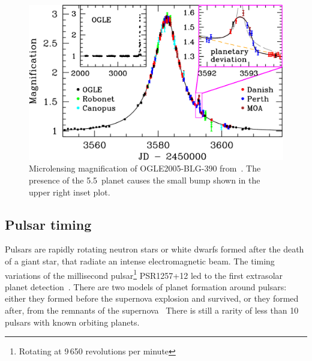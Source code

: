\begin{figure}
    \centering
    \includegraphics[width=0.5\linewidth]{./figures/introduction/Microlensing_OGLE2005-BLG-390.pdf}
    \caption{Microlensing magnification of OGLE2005-BLG-390 from~\citep{beaulieu_discovery_2006}.
    The presence of the 5.5\,\Mjup{} planet causes the small bump shown in the upper right inset plot.}
    \label{fig:microlensing_example}
\end{figure}


\subsection{Pulsar timing}
\label{sub:pulsar_timing}
Pulsars are rapidly rotating neutron stars or white dwarfs formed after the death of a giant star, that radiate an intense electromagnetic beam.
The timing variations of the millisecond pulsar\footnote{Rotating at 9\,650 revolutions per minute} {PSR1257+12} led to the first extrasolar planet detection~\citep{wolszczan_planetary_1992}.
There are two models of planet formation around pulsars: either they formed before the supernova explosion and survived, or they formed after, from the remnants of the supernova~\citep{Starovoit_existence_2017}
There is still a rarity of less than 10 pulsars with known orbiting planets.
